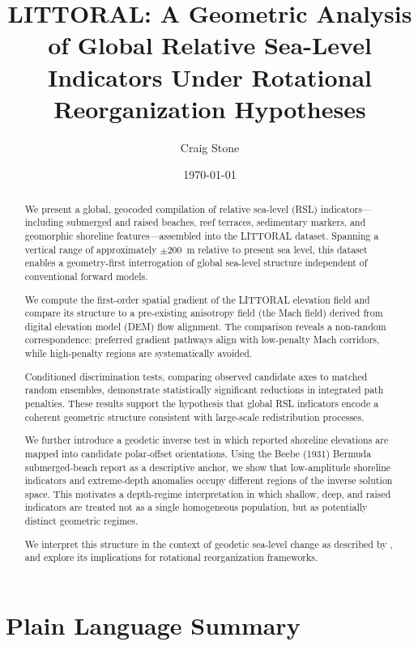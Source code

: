 \documentclass[twocolumn,10pt]{article}
\title{LITTORAL: A Geometric Analysis of Global Relative Sea-Level Indicators Under Rotational Reorganization Hypotheses}
\author{Craig Stone}
\date{\today}
\begin{document}
\maketitle

\begin{abstract}
We present a global, geocoded compilation of relative sea-level (RSL) indicators---including submerged and raised beaches, reef terraces, sedimentary markers, and geomorphic shoreline features---assembled into the LITTORAL dataset. Spanning a vertical range of approximately $\pm 200$~m relative to present sea level, this dataset enables a geometry-first interrogation of global sea-level structure independent of conventional forward models. 

We compute the first-order spatial gradient of the LITTORAL elevation field and compare its structure to a pre-existing anisotropy field (the Mach field) derived from digital elevation model (DEM) flow alignment. The comparison reveals a non-random correspondence: preferred gradient pathways align with low-penalty Mach corridors, while high-penalty regions are systematically avoided. 

Conditioned discrimination tests, comparing observed candidate axes to matched random ensembles, demonstrate statistically significant reductions in integrated path penalties. These results support the hypothesis that global RSL indicators encode a coherent geometric structure consistent with large-scale redistribution processes. 

We further introduce a geodetic inverse test in which reported shoreline elevations are mapped into candidate polar-offset orientations. Using the Beebe (1931) Bermuda submerged-beach report as a descriptive anchor, we show that low-amplitude shoreline indicators and extreme-depth anomalies occupy different regions of the inverse solution space. This motivates a depth-regime interpretation in which shallow, deep, and raised indicators are treated not as a single homogeneous population, but as potentially distinct geometric regimes.

We interpret this structure in the context of geodetic sea-level change as described by \citet{fairbridge1961}, and explore its implications for rotational reorganization frameworks.
\end{abstract}

\section{Plain Language Summary}
\end{document}
